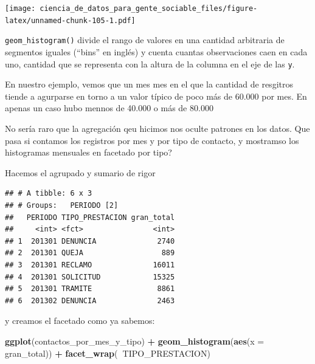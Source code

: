 \documentclass[]{book}
\newenvironment{Shaded}{\begin{snugshade}}{\end{snugshade}}
\newcommand{\KeywordTok}[1]{\textcolor[rgb]{0.13,0.29,0.53}{\textbf{#1}}}
\newcommand{\DataTypeTok}[1]{\textcolor[rgb]{0.13,0.29,0.53}{#1}}
\newcommand{\StringTok}[1]{\textcolor[rgb]{0.31,0.60,0.02}{#1}}
\newcommand{\OperatorTok}[1]{\textcolor[rgb]{0.81,0.36,0.00}{\textbf{#1}}}
\newcommand{\NormalTok}[1]{#1}
\begin{document}
\texttt{[image: ciencia\_de\_datos\_para\_gente\_sociable\_files/figure-latex/unnamed-chunk-105-1.pdf]}

\texttt{geom\_histogram()} divide el rango de valores en una cantidad
arbitraria de segmentos iguales (``bins'' en inglés) y cuenta cuantas
observaciones caen en cada uno, cantidad que se representa con la altura
de la columna en el eje de las \texttt{y}.

En nuestro ejemplo, vemos que un mes mes en el que la cantidad de
resgitros tiende a agurparse en torno a un valor típico de poco más de
60.000 por mes. En apenas un caso hubo mennos de 40.000 o más de 80.000

No sería raro que la agregación qeu hicimos nos oculte patrones en los
datos. Que pasa si contamos los registros por mes y por tipo de
contacto, y mostramso los histogramas mensuales en facetado por tipo?

Hacemos el agrupado y sumario de rigor

\begin{Shaded}
\end{Shaded}

\begin{verbatim}
## # A tibble: 6 x 3
## # Groups:   PERIODO [2]
##   PERIODO TIPO_PRESTACION gran_total
##     <int> <fct>                <int>
## 1  201301 DENUNCIA              2740
## 2  201301 QUEJA                  889
## 3  201301 RECLAMO              16011
## 4  201301 SOLICITUD            15325
## 5  201301 TRAMITE               8861
## 6  201302 DENUNCIA              2463
\end{verbatim}

y creamos el facetado como ya sabemos:

\begin{Shaded}
\begin{Highlighting}[]
\KeywordTok{ggplot}\NormalTok{(contactos_por_mes_y_tipo) }\OperatorTok{+}\StringTok{ }
\StringTok{    }\KeywordTok{geom_histogram}\NormalTok{(}\KeywordTok{aes}\NormalTok{(}\DataTypeTok{x =}\NormalTok{ gran_total)) }\OperatorTok{+}
\StringTok{    }\KeywordTok{facet_wrap}\NormalTok{(}\OperatorTok{~}\NormalTok{TIPO_PRESTACION)}
\end{Highlighting}
\end{Shaded}
\end{document}
